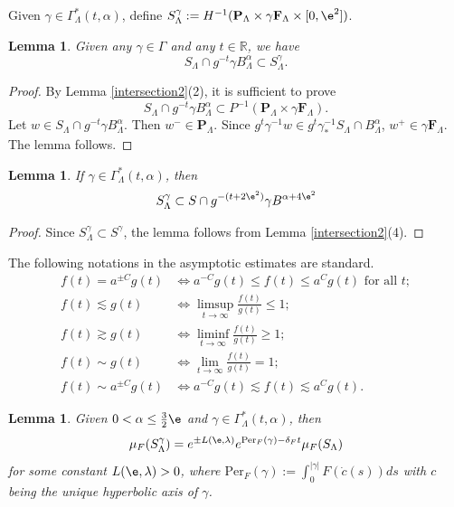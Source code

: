 \documentclass[11pt]{amsart}
\newtheorem{lemma}[theorem]{Lemma}
\theoremstyle{definition}
\newcommand{\R}{\mathcal{R}}
\def\RR{{\mathbb R}}
\def\a{\alpha}
\def\c{\gamma}   \def\C{\Gamma}
\def\d{\delta}   %
\def\l{\lambda}   \def\L{\Lambda}
\def\bP{\textbf{P}}
\def\bF{\textbf{F}}
\newcommand{\Per}{\mathrm{Per}}
\begin{document}
Given $\c\in \C_\L^*(t,\a)$, define $S_\L^\c:=H^{-1}(\bP_\L\times \c\bF_\L\times [0,\e^2])$.
\begin{lemma}\label{depth2}
Given any $\c\in \C$ and any $t\in \RR$, we have
$$S_\L\cap g^{-t}\c B^\a_\L\subset S_\L^\c.$$
\end{lemma}
\begin{proof}
By Lemma \ref{intersection2}(2), it is sufficient to prove 
$$S_\L\cap g^{-t}\c B^\a_\L\subset P^{-1}(\bP_\L\times \c\bF_\L).$$
Let $w\in S_\L\cap g^{-t}\c B^\a_\L$. Then $w^-\in \bP_\L$. Since $g^t\c^{-1}w\in g^{t}\c^{-1}_*S_{\L}\cap  B_{\L}^\a$, $w^+\in \c \bF_\L$. The lemma follows.
\end{proof}

\begin{lemma}\label{depth1}
If $\c\in \C_\L^*(t,\a)$, then 
$$S_\L^\c\subset S\cap g^{-(t+2\e^2)}\c B^{\a+4\e^2}$$
\end{lemma}
\begin{proof}
Since $S_\L^\c \subset S^\c$, the lemma follows from Lemma \ref{intersection2}(4).
\end{proof}

The following notations in the asymptotic estimates are standard.
\begin{equation*}
\begin{aligned}
f(t)=a^{\pm C}g(t)&\Leftrightarrow a^{-C}g(t)\le f(t)\le a^{C}g(t) \text{\ for all\ } t;\\
f(t) \lesssim g(t) &\Leftrightarrow \limsup_{t\to \infty}\frac{f(t)}{g(t)}\le 1;\\
f(t) \gtrsim g(t) &\Leftrightarrow \liminf_{t\to \infty}\frac{f(t)}{g(t)}\ge 1;\\
f(t) \sim g(t) &\Leftrightarrow \lim_{t\to \infty}\frac{f(t)}{g(t)}= 1;\\
f(t)\sim a^{\pm C}g(t)&\Leftrightarrow a^{-C}g(t)\lesssim f(t)\lesssim a^{C}g(t).
\end{aligned}
\end{equation*}



\begin{lemma}\label{scaling1}
Given $0<\a\le \frac{3}{2}\e$ and $\c\in \C^*_{\L}(t,\a)$, then
$$\mu_F(S_\L^\c)=e^{\pm L(\e,\l)}e^{\Per_F(\c)-\d_Ft}\mu_F(S_\L)$$
for some constant $L(\e,\l)>0$, where $\Per_F(\c):=\int_0^{|\c|}F(\dot c(s))ds$ with $c$ being the unique hyperbolic axis of $\c$.
\end{lemma}
\end{document}
